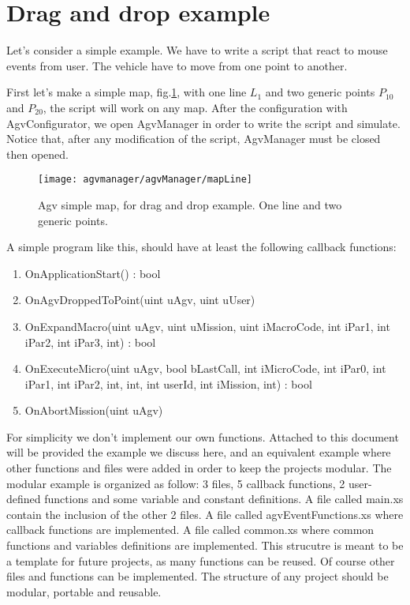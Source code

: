 \section{Drag and drop example}
Let's consider a simple example. We have to write a script that react to mouse events from user. The vehicle have to move from one point to another.

First let's make a simple map, fig.\ref{fig:mapLine}, with one line $L_{1}$ and two generic points $P_{10}$ and $P_{20}$, the script will work on any map.
After the configuration with AgvConfigurator, we open AgvManager in order to write the script and simulate.
Notice that, after any modification of the script, AgvManager must be closed then opened.\\

\begin{figure}
	\centering\texttt{[image: agvmanager/agvManager/mapLine]}
	\caption{Agv simple map, for drag and drop example. One line and two generic points.}
	\label{fig:mapLine}
\end{figure}

A simple program like this, should have at least the following callback functions:
\begin{enumerate}  
	\item OnApplicationStart() : bool 
	\item OnAgvDroppedToPoint(uint uAgv, uint uUser) 
	\item OnExpandMacro(uint uAgv, uint uMission, uint iMacroCode, int iPar1, int iPar2, int iPar3, int) : bool
	\item OnExecuteMicro(uint uAgv, bool bLastCall, int iMicroCode, int iPar0, int iPar1, int iPar2, int, int, int userId, int iMission, int) : bool
	\item OnAbortMission(uint uAgv)\\
\end{enumerate}

For simplicity we don't implement our own functions. Attached to this document will be provided the example we discuss here, and an equivalent example where other functions and files were added in order to keep the projects modular.
The modular example is organized as follow: 3 files, 5 callback functions, 2 user-defined functions and some variable and constant definitions.
A file called main.xs contain the inclusion of the other 2 files. A file called agvEventFunctions.xs where callback functions are implemented.
A file called common.xs where common functions and variables definitions are implemented. This strucutre is meant to be a template for future projects, as many functions can be reused. Of course other files and functions can be implemented. The structure of any project should be modular, portable and reusable.\\

